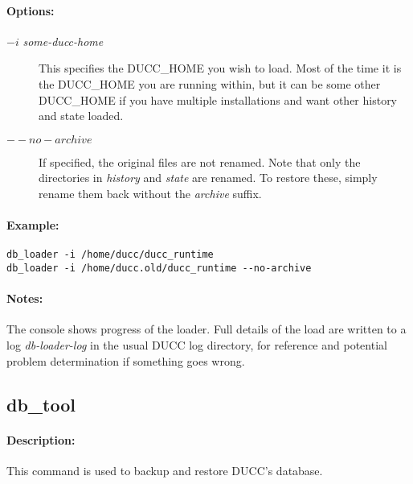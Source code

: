     \paragraph{Options:}
    \begin{description}
        \item[$-i$ {\em some-ducc-home}] 
          This specifies the DUCC\_HOME you wish to load.  Most of the time it is the DUCC\_HOME you
          are running within, but it can be some other DUCC\_HOME if you have multiple installations and
          want other history and state loaded.
        \item[$--no-archive$] 
          If specified, the original files are not renamed.  Note that only the directories in {\em history}
          and {\em state} are renamed.  To restore these, simply rename them back without the {\em archive}
          suffix.
     \end{description}
        
    \paragraph{Example:}
\begin{verbatim}
db_loader -i /home/ducc/ducc_runtime
db_loader -i /home/ducc.old/ducc_runtime --no-archive
\end{verbatim}

    \paragraph{Notes:}
    The console shows progress of the loader.  Full details of the load are written to a log {\em db-loader-log}
    in the usual DUCC log directory, for reference and potential problem determination if something goes wrong.
    
    
\subsection{db\_tool}
\label{subsec:admin.db-tool}

    \paragraph{Description:}
        This command is used to backup and restore DUCC's database.
        
